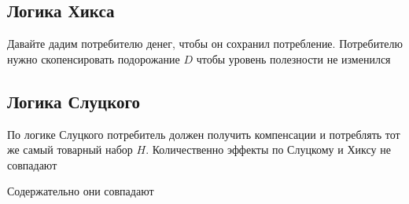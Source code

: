 \documentclass[14pt]{extarticle}
\begin{document}
 \subsection{Логика Хикса}
 Давайте дадим потребителю
 денег, чтобы он сохранил потребление.
 Потребителю нужно скопенсировать подорожание
 $D$ чтобы уровень полезности не изменился
 \subsection{Логика Слуцкого}
 По логике Слуцкого потребитель должен получить
 компенсации и потреблять тот же самый товарный набор $H$.
 Количественно эффекты по Слуцкому и Хиксу не совпадают

 Содержательно они совпадают
\end{document}
